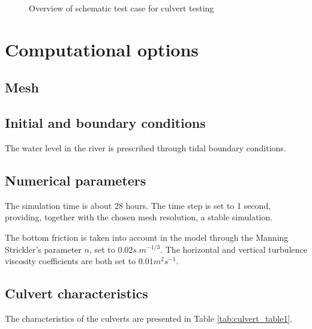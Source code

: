 \begin{figure}[h]
\begin{center}
\end{center}
\caption{Overview of schematic test case for culvert testing}
\label{fig:culvert_figure1}
\end{figure}

\section{Computational options}
%
\subsection{Mesh}

\subsection{Initial and boundary conditions}
The water level in the river is prescribed through tidal boundary conditions.
%
\subsection{Numerical parameters}


The simulation time is about 28 hours.
The time step is set to 1 second, providing, together with the chosen mesh resolution, a stable simulation.

The bottom friction is taken into account in the model through the Manning Strickler’s parameter $n$, set to $0.02 s.m^{-1/3}$.
The horizontal and vertical turbulence viscosity coefficients are both set to $0.01 m^2s^{-1}$.

\subsection{Culvert characteristics}
The characteristics of the culverts are presented in Table \ref{tab:culvert_table1}.

